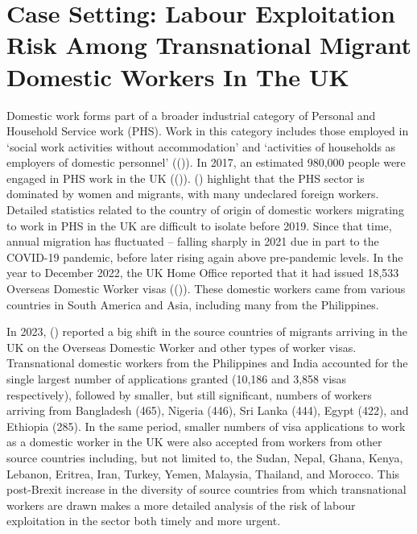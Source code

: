 \documentclass[
  12pt,
]{article}
\theoremstyle{plain}
\theoremstyle{definition}
\begin{document}
\section{Case Setting: Labour Exploitation Risk Among Transnational
Migrant Domestic Workers In The
UK}\label{case-setting-labour-exploitation-risk-among-transnational-migrant-domestic-workers-in-the-uk}

Domestic work forms part of a broader industrial category of Personal
and Household Service work (PHS). Work in this category includes those
employed in `social work activities without accommodation' and
`activities of households as employers of domestic personnel'
(()).
In 2017, an estimated 980,000 people were engaged in PHS work in the UK
(()).
()
highlight that the PHS sector is dominated by women and migrants, with
many undeclared foreign workers. Detailed statistics related to the
country of origin of domestic workers migrating to work in PHS in the UK
are difficult to isolate before 2019. Since that time, annual migration
has fluctuated -- falling sharply in 2021 due in part to the COVID-19
pandemic, before later rising again above pre-pandemic levels. In the
year to December 2022, the UK Home Office reported that it had issued
18,533 Overseas Domestic Worker visas
(()). These
domestic workers came from various countries in South America and Asia,
including many from the Philippines.

In 2023,
()
reported a big shift in the source countries of migrants arriving in the
UK on the Overseas Domestic Worker and other types of worker visas.
Transnational domestic workers from the Philippines and India accounted
for the single largest number of applications granted (10,186 and 3,858
visas respectively), followed by smaller, but still significant, numbers
of workers arriving from Bangladesh (465), Nigeria (446), Sri Lanka
(444), Egypt (422), and Ethiopia (285). In the same period, smaller
numbers of visa applications to work as a domestic worker in the UK were
also accepted from workers from other source countries including, but
not limited to, the Sudan, Nepal, Ghana, Kenya, Lebanon, Eritrea, Iran,
Turkey, Yemen, Malaysia, Thailand, and Morocco. This post-Brexit
increase in the diversity of source countries from which transnational
workers are drawn makes a more detailed analysis of the risk of labour
exploitation in the sector both timely and more urgent.
\end{document}
